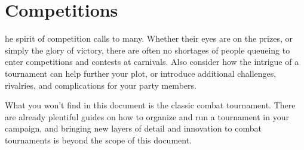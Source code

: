 \documentclass[10pt,a4paper,twoside,bg=print,twocolumn,openany,nodeprecatedcode]{dndbook}
\begin{document}
\chapter{Competitions}
he spirit of competition calls to many. Whether their eyes are on the prizes, or simply the glory of victory, there are often no shortages of people queueing to enter competitions and contests at carnivals. Also consider how the intrigue of a tournament can help further your plot, or introduce additional challenges, rivalries, and complications for your party members.

What you won't find in this document is the classic combat tournament. There are already plentiful guides on how to organize and run a tournament in your campaign, and bringing new layers of detail and innovation to combat tournaments is beyond the scope of this document.
\end{document}
